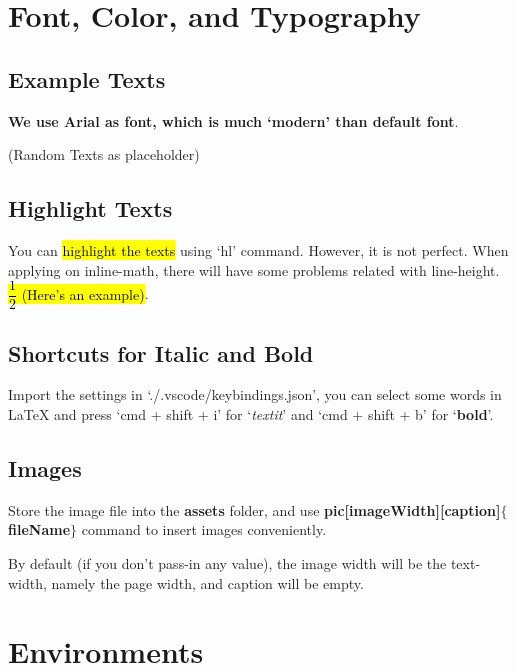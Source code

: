 \documentclass[12pt]{article}
\begin{document}
    \tableofcontents

    \newpage

    \section{Font, Color, and Typography}
    \subsection{Example Texts}

    \textbf{We use Arial as font, which is much `modern' than default font}.

    (Random Texts as placeholder) \lipsum[66]    %

    \subsection{Highlight Texts}

    You can \hl{highlight the texts} using `hl' command. However, it is not perfect. When applying on inline-math, there will have some problems related with line-height. \hl{$\dfrac{1}{2}$ (Here's an example)}.

    \subsection{Shortcuts for Italic and Bold}

    Import the settings in `./.vscode/keybindings.json', you can select some words in LaTeX and press `cmd + shift + i' for `\textit{textit}' and `cmd + shift + b' for `\textbf{bold}'.

    \subsection{Images}

    Store the image file into the \textbf{assets} folder, and use \textbf{pic[imageWidth][caption]$\{$fileName$\}$} command to insert images conveniently.


    By default (if you don't pass-in any value), the image width will be the text-width, namely the page width, and caption will be empty.

    \newpage
    \section{Environments}
\end{document}
